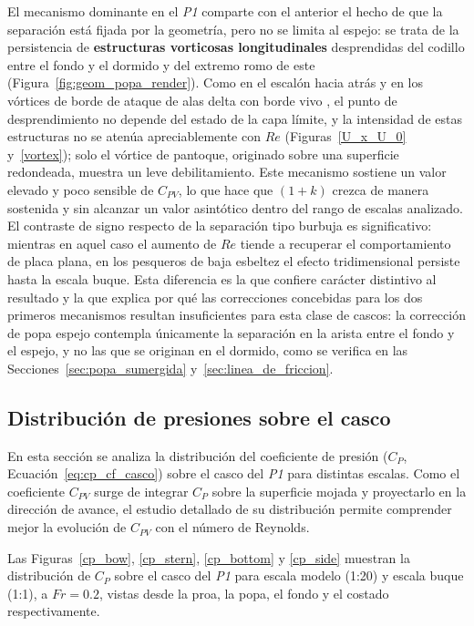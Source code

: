 El mecanismo dominante en el \textit{P1} comparte con el anterior el hecho
de que la separación está fijada por la geometría, pero no se limita al
espejo: se trata de la persistencia de \textbf{estructuras vorticosas
longitudinales} desprendidas del codillo entre el fondo y el dormido y del
extremo romo de este (Figura~\ref{fig:geom_popa_render}). Como en el escalón
hacia atrás y en los vórtices de borde de ataque de alas delta con borde
vivo \citep{armaly1983bfs, luckring2002}, el punto de desprendimiento no
depende del estado de la capa límite, y la intensidad de estas estructuras
no se atenúa apreciablemente con $Re$ (Figuras~\ref{U_x_U_0}
y~\ref{vortex}); solo el vórtice de pantoque, originado sobre una
superficie redondeada, muestra un leve debilitamiento. Este mecanismo
sostiene un valor elevado y poco sensible de $C_{PV}$, lo que hace que
$(1+k)$ crezca de manera sostenida y sin alcanzar un valor asintótico
dentro del rango de escalas analizado. El contraste de signo respecto de la
separación tipo burbuja es significativo: mientras en aquel caso el aumento
de $Re$ tiende a recuperar el comportamiento de placa plana, en los
pesqueros de baja esbeltez el efecto tridimensional persiste hasta la
escala buque. Esta diferencia es la que confiere carácter distintivo al
resultado y la que explica por qué las correcciones concebidas para los dos
primeros mecanismos resultan insuficientes para esta clase de cascos: la
corrección de popa espejo contempla únicamente la separación en la arista
entre el fondo y el espejo, y no las que se originan en el dormido, como se
verifica en las Secciones~\ref{sec:popa_sumergida}
y~\ref{sec:linea_de_friccion}.

\subsection{Distribución de presiones sobre el casco}\label{sec:distribucion_presiones}

En esta sección se analiza la distribución del coeficiente de presión 
($C_P$, Ecuación~\eqref{eq:cp_cf_casco}) sobre el casco del \textit{P1} para distintas escalas. Como 
el coeficiente $C_{PV}$ surge de integrar $C_P$ sobre la superficie 
mojada y proyectarlo en la dirección de avance, el estudio 
detallado de su distribución permite comprender mejor la evolución de 
$C_{PV}$ con el número de Reynolds.

Las Figuras~\ref{cp_bow}, \ref{cp_stern}, \ref{cp_bottom} y \ref{cp_side} 
muestran la distribución de $C_P$ sobre el casco del \textit{P1} para escala 
modelo (1:20) y escala buque (1:1), a $Fr=0{.}2$, vistas desde la proa, la 
popa, el fondo y el costado respectivamente.

